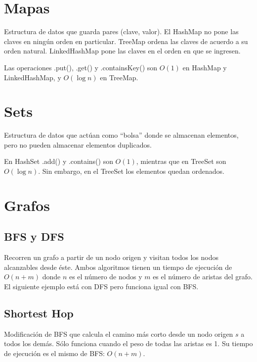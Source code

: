 \documentclass{article}
\begin{document}
\begin{multicols}{2}
\section{Mapas}
Estructura de datos que guarda pares (clave, valor). El HashMap no pone las claves en ningún orden en particular. TreeMap ordena las claves de acuerdo a su orden natural. LinkedHashMap pone las claves en el orden en que se ingresen.

Las operaciones .put(), .get() y .containsKey() son \( O(1) \) en HashMap y LinkedHashMap, y \( O(\log n)\) en TreeMap.


\section{Sets}
Estructura de datos que actúan como ``bolsa'' donde se almacenan elementos, pero no pueden almacenar elementos duplicados.

En HashSet .add() y .contains() son \( O(1) \), mientras que en TreeSet son \( O(\log n)\). Sin embargo, en el TreeSet los elementos quedan ordenados.


\section{Grafos}
	\subsection{BFS y DFS}
	Recorren un grafo a partir de un nodo origen y visitan todos los nodos alcanzables desde éste. Ambos algoritmos tienen un tiempo de ejecución de \( O(n + m) \) donde \( n \) es el número de nodos y \( m \) es el número de aristas del grafo. El siguiente ejemplo está con DFS pero funciona igual con BFS.	
	

	\subsection{Shortest Hop}
	Modificación de BFS que calcula el camino más corto desde un nodo origen \(s\) a todos los demás. Sólo funciona cuando el peso de todas las aristas es 1. Su tiempo de ejecución es el mismo de BFS: \( O(n + m) \).
	
	

\end{multicols}
\end{document}
